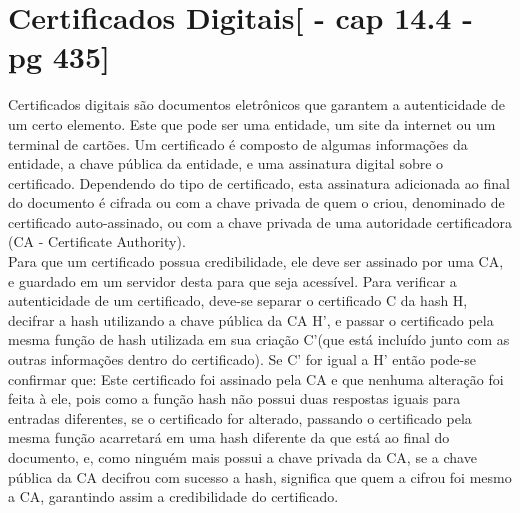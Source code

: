 \documentclass{article}
\begin{document}
	\section{Certificados Digitais[\cite{STALLINS} - cap 14.4 - pg 435]}
		\begin{flushleft}
			\begin{large}
				
				\hspace{2cm}Certificados digitais são documentos eletrônicos que garantem a autenticidade de um certo elemento. Este que pode ser uma entidade, um site da internet ou um terminal de cartões. Um certificado é composto de algumas informações da entidade,  a chave pública da entidade, e uma assinatura digital sobre o certificado. Dependendo do tipo de certificado, esta assinatura adicionada ao final do documento é cifrada ou com a chave privada de quem o criou, denominado de certificado auto-assinado, ou com a chave privada de uma autoridade certificadora (CA - Certificate Authority). \\
				\hspace{2cm} Para que um certificado possua credibilidade, ele deve ser assinado por uma CA, e guardado em um servidor desta para que seja acessível. Para verificar a autenticidade de um certificado, deve-se separar o certificado C da hash H, decifrar a hash utilizando a chave pública da CA H’, e passar o certificado pela mesma função de hash utilizada em sua criação C’(que está incluído junto com as outras informações dentro do certificado). Se C’ for igual a H’ então pode-se confirmar que: Este certificado foi assinado pela CA e que nenhuma alteração foi feita à ele, pois como a função hash não possui duas respostas iguais para entradas diferentes, se o certificado for alterado, passando o certificado pela mesma função acarretará em uma hash diferente da que está ao final do documento, e, como ninguém mais possui a chave privada da CA, se a chave pública da CA decifrou com sucesso a hash, significa que quem a cifrou foi mesmo a CA, garantindo assim a credibilidade do certificado.

			\end{large}
		\end{flushleft}

    
\end{document}
